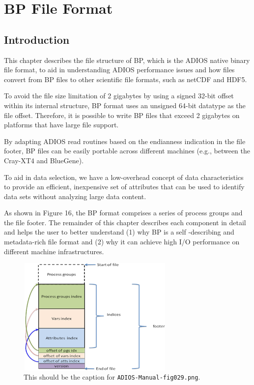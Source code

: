 \chapter{BP File Format}

\section{Introduction}

This chapter describes the file structure of BP, which is the ADIOS native binary 
file format, to aid in understanding ADIOS performance issues and how files convert 
from BP files to other scientific file formats, such as netCDF and HDF5.

To avoid the file size limitation of 2 gigabytes by using a signed 32-bit offset 
within its internal structure, BP format uses an unsigned 64-bit datatype as the 
file offset. Therefore, it is possible to write BP files that exceed 2 gigabytes 
on platforms that have large file support. 

By adapting ADIOS read routines based on the endianness indication in the file 
footer, BP files can be easily portable across different machines (e.g., between 
the Cray-XT4 and BlueGene). 

To aid in data selection, we have a low-overhead concept of data characteristics 
to provide an efficient, inexpensive set of attributes that can be used to identify 
data sets without analyzing large data content.

As shown in Figure 16, the BP format comprises a series of process groups and the 
file footer. The remainder of this chapter describes each component in detail and 
helps the user to better understand (1) why BP is a self -describing and metadata-rich 
file format and (2) why it can achieve high I/O performance on different machine 
infrastructures. 

\begin{figure}[htbp]
\begin{center}
\includegraphics[width=217pt, height=163pt]{ADIOS-Manual-fig029.png}
\caption{This should be the caption for \texttt{ADIOS-Manual-fig029.png}.}
\end{center}
\end{figure}\label{HRef119578739}\label{HToc144350175}

